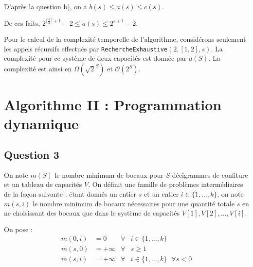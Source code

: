 \documentclass[12pt,a4paper]{article}
\begin{document}
\begin{enumerate}[a)]
D'apr\`es la question b), on a $ b(s) \leq a(s) \leq c(s) $. 

De ces faits, $ 2^{\lceil \frac{s}{2} \rceil + 1} - 2 \leq a(s) \leq 2^{s+1} - 2 $.

Pour le calcul de la complexit\'e temporelle de l'algorithme, consid\'erons seulement les appels r\'ecursifs effectu\'es par \texttt{RechercheExhaustive}$(2,[1,2],s)$.
La complexit\'e pour ce syst\`eme de deux capacit\'es est donn\'ee par $a(S)$. La complexit\'e est ainsi en $\Omega\left(\sqrt{2}^S\right)$ et $\mathcal{O}(2^S)$.

\end{enumerate}

\section{Algorithme II : Programmation dynamique}

\subsection*{Question 3}
On note $m(S)$ le nombre minimum de bocaux pour $S$ d\'ecigrammes de confiture et un tableau de capacit\'es $V$. On d\'efinit une famille de probl\`emes interm\'ediaires de la fa\c{c}on suivante : \'etant donn\'es un entier $s$ et un entier $i \in \{1, \dotsc, k\}$, on note $m(s,i)$ le nombre minimum de bocaux n\'ecessaires pour une quantit\'e totale $s$ en ne choisissant des bocaux que dans le syst\`eme de capacit\'es $V[1],V[2],\dotsc,V[i]$.

On pose :
\begin{align*}
 m(0,i) &= 0 & \forall & i \in \{1,\dotsc, k\} \\
 m(s,0) &= +\infty & \forall & s \geq 1 \\
 m(s,i) &= + \infty & \forall & i \in \{1,\dotsc,k\} \text{ }\forall s < 0
\end{align*}
\end{document}
